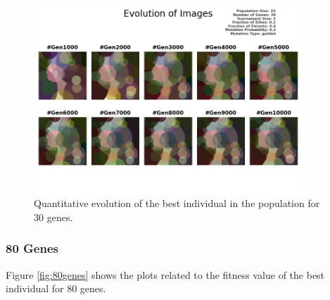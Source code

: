 \documentclass{assignment}
\begin{document}
\begin{figure}[!htb]
    \centering
    \includegraphics[width=0.9\textwidth]{figures/images_output_20_30_5_0.2_0.6_0.2_guided.png}
    \caption{Quantitative evolution of the best individual in the population for 30 genes.}
    \label{fig:30genes_image}
\end{figure}

\subsubsection{80 Genes}
Figure \ref{fig:80genes} shows the plots related to the fitness value of the best individual for 80 genes.
\end{document}

